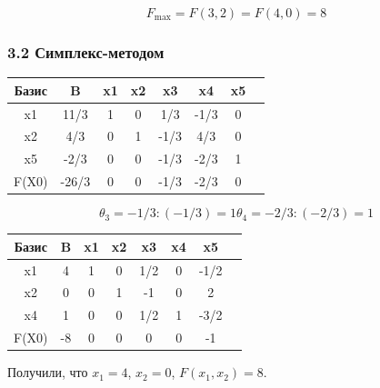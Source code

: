 \documentclass[17pt]{extarticle}
\begin{document}
\[
    F_{\text{max}} = F(3, 2) = F(4, 0) = 8
\]

\subsubsection*{3.2 Симплекс-методом}

\begin{table}[H]
    \centering
    \begin{tabular}{c|c|cccccc}
        \toprule
        Базис & B     & x1 & x2 & x3   & x4   & x5 \\
        \midrule
        x1    & 11/3  & 1  & 0  & 1/3  & -1/3 & 0  \\
        x2    & 4/3   & 0  & 1  & -1/3 & 4/3  & 0  \\
        x5    & -2/3  & 0  & 0  & -1/3 & -2/3 & 1  \\
        F(X0) & -26/3 & 0  & 0  & -1/3 & -2/3 & 0  \\
        \bottomrule
    \end{tabular}
\end{table}
\[
    \theta_3=-1/3 : (-1/3)=1
    \theta_4=-2/3 : (-2/3)=1
\]

\begin{table}[H]
    \centering
    \begin{tabular}{c|c|cccccc}
        \toprule
        Базис & B  & x1 & x2 & x3  & x4 & x5   \\
        \midrule
        x1    & 4  & 1  & 0  & 1/2 & 0  & -1/2 \\
        x2    & 0  & 0  & 1  & -1  & 0  & 2    \\
        x4    & 1  & 0  & 0  & 1/2 & 1  & -3/2 \\
        F(X0) & -8 & 0  & 0  & 0   & 0  & -1   \\
        \bottomrule
    \end{tabular}
\end{table}

Получили, что \(x_1 = 4\), \(x_2 = 0\), \(F(x_1, x_2) = 8\).
\end{document}
